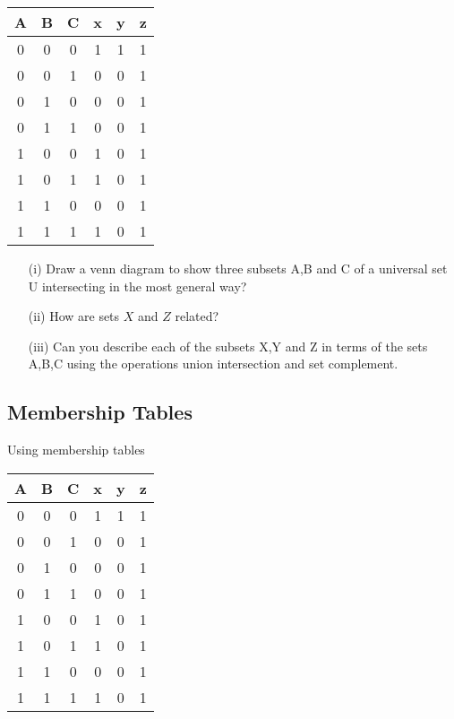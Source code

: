 \documentclass[11pt,a4paper,titlepage,oneside,openany]{article}
\numberwithin{equation}{section}
\numberwithin{algorithm}{section}
\numberwithin{figure}{section}
\numberwithin{table}{section}
\begin{document}
\begin{tabular}{|ccc|c|c|c|}
	\hline
	A & B & C & x & y & z \\\hline
	0 & 0 & 0 & 1 & 1 & 1 \\
	0 & 0 & 1 & 0 & 0 & 1 \\
	0 & 1 & 0 & 0 & 0 & 1 \\
	0 & 1 & 1 & 0 & 0 & 1 \\
	1 & 0 & 0 & 1 & 0 & 1 \\
	1 & 0 & 1 & 1 & 0 & 1 \\
	1 & 1 & 0 & 0 & 0 & 1 \\
	1 & 1 & 1 & 1 & 0 & 1 \\
	\hline
\end{tabular}
\begin{itemize}
	\item[(i)] Draw a venn diagram to show three subsets A,B and C of a universal set U intersecting in
	the most general way?
	\item[(ii)] How are sets $X$ and $Z$ related?
	\item[(iii)] Can you describe each of the subsets X,Y and Z in terms  of the
	sets A,B,C using the operations union intersection and set complement.
\end{itemize}

\newpage

\subsection*{Membership Tables}
Using membership tables
\begin{tabular}{|ccc|c|c|c|}
  \hline
  A & B & C & x & y & z \\\hline
  0 & 0 & 0 & 1 & 1 & 1 \\
  0 & 0 & 1 & 0 & 0 & 1 \\
  0 & 1 & 0 & 0 & 0 & 1 \\
  0 & 1 & 1 & 0 & 0 & 1 \\
  1 & 0 & 0 & 1 & 0 & 1 \\
  1 & 0 & 1 & 1 & 0 & 1 \\
  1 & 1 & 0 & 0 & 0 & 1 \\
  1 & 1 & 1 & 1 & 0 & 1 \\
  \hline
\end{tabular}
\end{document}
